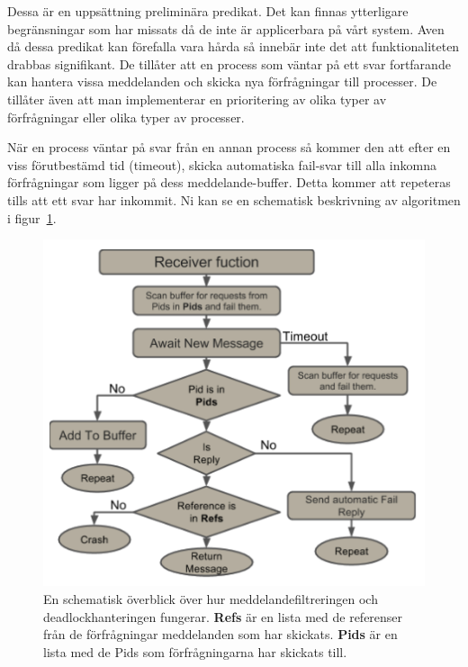 \documentclass[12pt]{article}
\begin{document}
Dessa är en uppsättning preliminära predikat.
Det kan finnas ytterligare begränsningar som har missats då de inte är applicerbara på vårt system.
Aven då dessa predikat
kan förefalla vara hårda så innebär inte det att funktionaliteten drabbas signifikant.
De tillåter att en process som väntar på ett svar fortfarande kan hantera vissa meddelanden och skicka nya förfrågningar till processer.
De tillåter även att man implementerar en prioritering av olika typer av förfrågningar eller olika typer av processer.

När en process väntar på svar från en annan process så kommer den att efter en viss förutbestämd tid (timeout),
skicka automatiska fail-svar till alla inkomna förfrågningar som ligger på dess meddelande-buffer.
Detta kommer att repeteras tills att ett svar har inkommit.
Ni kan se en schematisk beskrivning av algoritmen i figur~\ref{fig:deadlock}.

\begin{figure}
    \centering
    \includegraphics[width=\textwidth]{BugsLife-Fig4.png}
    \caption{
        En schematisk överblick över hur meddelandefiltreringen och deadlockhanteringen fungerar.
        \textbf{Refs} är en lista med de referenser från de förfrågningar meddelanden som har skickats.
        \textbf{Pids} är en lista med de Pids som förfrågningarna har skickats till.
    }\label{fig:deadlock}
\end{figure}
\end{document}
